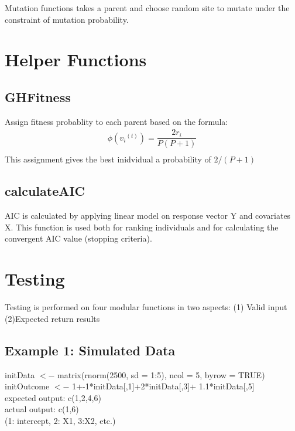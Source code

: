 \documentclass{article}\usepackage[]{graphicx}\usepackage[]{color}
\begin{document}
Mutation functions takes a parent and choose random site to mutate under the constraint of mutation probability.\\
\section{Helper Functions}
\subsection{GHFitness}
Assign fitness probablity to each parent based on the formula:
\begin{gather*}
\phi({v_i}^{(t)}) = \dfrac{2r_i}{P(P+1)}\\
\end{gather*}
This assignment gives the best inidvidual a probability of \(2/(P+1)\)
\subsection{calculateAIC}
AIC is calculated by applying linear model on response vector Y and covariates X. This function is used both for ranking individuals and for calculating the convergent AIC value (stopping criteria).

\section{Testing}
Testing is performed on four modular functions in two aspects: (1) Valid input (2)Expected return results
\subsection{Example 1: Simulated Data}
initData \(<-\) matrix(rnorm(2500, sd = 1:5), ncol = 5, byrow = TRUE)\\
initOutcome \(<-\) 1+-1*initData[,1]+2*initData[,3]+ 1.1*initData[,5]\\
expected output: c(1,2,4,6) \\
actual output: c(1,6)\\
(1: intercept, 2: X1, 3:X2, etc.)\\
\end{document}
